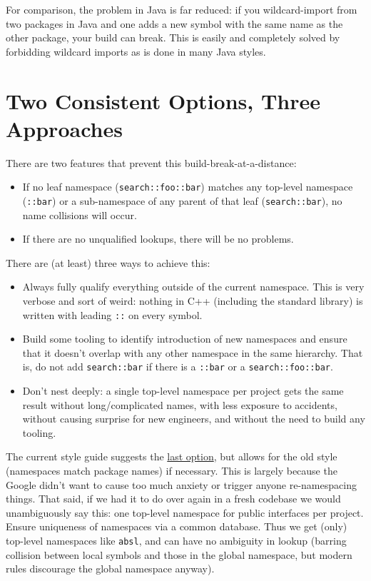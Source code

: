 For comparison, the problem in Java is far reduced: if you wildcard-import from two packages in Java and one adds a new symbol with the same name as the other package, your build can break. This is easily and completely solved by forbidding wildcard imports as is done in many Java styles.

\section{Two Consistent Options, Three Approaches}
There are two features that prevent this build-break-at-a-distance:
\begin{itemize}
  \item If no leaf namespace (\texttt{search::foo::bar}) matches any top-level namespace (\texttt{::bar}) or a sub-namespace of any parent of that leaf (\texttt{search::bar}), no name collisions will occur.
  \item If there are no unqualified lookups, there will be no problems.
\end{itemize}

There are (at least) three ways to achieve this:
\begin{itemize}
  \item Always fully qualify everything outside of the current namespace. This is very verbose and sort of weird: nothing in C++ (including the standard library) is written with leading \texttt{::} on every symbol.
  \item Build some tooling to identify introduction of new namespaces and ensure that it doesn’t overlap with any other namespace in the same hierarchy. That is, do not add \texttt{search::bar} if there is a \texttt{::bar} or a \texttt{search::foo::bar}.
  \item Don’t nest deeply: a single top-level namespace per project gets the same result without long/complicated names, with less exposure to accidents, without causing surprise for new engineers, and without the need to build any tooling.
\end{itemize}

The current style guide suggests the \hyperref[subsec:namespace-names]{last option}, but allows for the old style (namespaces match package names) if necessary. This is largely because the Google didn’t want to cause too much anxiety or trigger anyone re-namespacing things. That said, if we had it to do over again in a fresh codebase we would unambiguously say this: one top-level namespace for public interfaces per project. Ensure uniqueness of namespaces via a common database. Thus we get (only) top-level namespaces like \texttt{absl}, and can have no ambiguity in lookup (barring collision between local symbols and those in the global namespace, but modern rules discourage the global namespace anyway).

